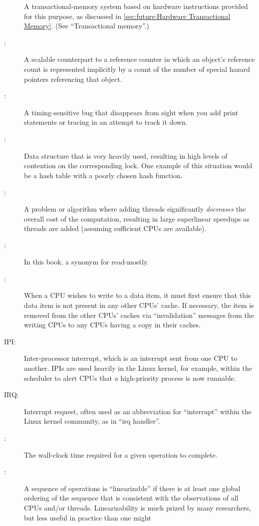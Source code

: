 \begin{description}
	A transactional-memory system based on hardware instructions
	provided for this purpose, as discussed in
	\cref{sec:future:Hardware Transactional Memory}.
	(See ``Transactional memory''.)
\item[\IXG{Hazard Pointer}:]
	A scalable counterpart to a reference counter in which an
	object's reference count is represented implicitly by a count
	of the number of special hazard pointers referencing that object.
\item[\IXG{Heisenbug}:]
	A timing-sensitive bug that disappears from sight when you
	add print statements or tracing in an attempt to track it
	down.
\item[\IXG{Hot Spot}:]
	Data structure that is very heavily used, resulting in high
	levels of contention on the corresponding lock.
	One example of this situation would be a hash table with
	a poorly chosen hash function.
\item[\IXG{Humiliatingly Parallel}:]
	A problem or algorithm where adding threads significantly
	\emph{decreases} the overall cost of the computation, resulting in
	large superlinear speedups as threads are added (assuming sufficient
	CPUs are available).
\item[\IXG{Immutable}:]
	In this book, a synonym for read-mostly.
\item[\IXG{Invalidation}:]
	When a CPU wishes to write to a data item, it must first ensure
	that this data item is not present in any other CPUs' cache.
	If necessary, the item is removed from the other CPUs' caches
	via ``invalidation'' messages from the writing CPUs to any
	CPUs having a copy in their caches.
\item[IPI:]
	Inter-processor interrupt, which is an
	interrupt sent from one CPU to another.
	IPIs are used heavily in the Linux kernel, for example, within
	the scheduler to alert CPUs that a high-priority process is now
	runnable.
\item[IRQ:]
	Interrupt request, often used as an abbreviation for ``interrupt''
	within the Linux kernel community, as in ``irq handler''.
\item[\IXG{Latency}:]
	The wall-clock time required for a given operation to complete.
\item[\IXG{Linearizable}:]
	A sequence of operations is ``linearizable'' if there is at
	least one global ordering of the sequence that is consistent
	with the observations of all CPUs and/or threads.
	Linearizability is much prized by many researchers, but less
	useful in practice than one might

\end{description}
